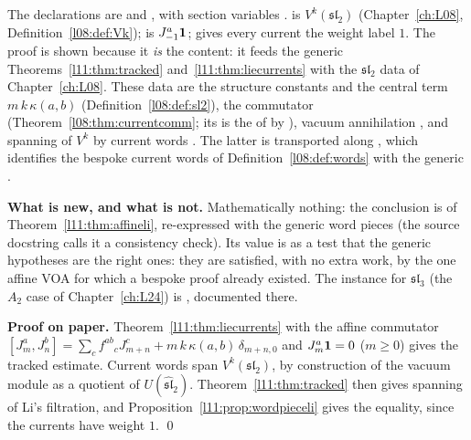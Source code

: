 \begin{dictionary}
The declarations are \allowbreak{}\allowbreak{}\allowbreak{} and
\allowbreak{}\allowbreak{}\allowbreak{}, with section variables
.  is $V^k(\mathfrak{sl}_2)$ (Chapter~\ref{ch:L08},
Definition~\ref{l08:def:Vk});  is $J^a_{-1}\mathbf{1}$;  gives every current the weight
label $1$. The proof is shown because it \emph{is} the content: it feeds the generic
Theorems~\ref{l11:thm:tracked} and~\ref{l11:thm:liecurrents} with the $\mathfrak{sl}_2$ data of Chapter~\ref{ch:L08}. These
data are the structure constants  and the central term $m\,k\,\kappa(a,b)$
(Definition~\ref{l08:def:sl2}), the commutator  (Theorem~\ref{l08:thm:currentcomm}; its
 is the  of  by ), vacuum annihilation , and
spanning of $V^k$ by current words . The latter is transported along
, which identifies the bespoke current words of Definition~\ref{l08:def:words} with
the generic .

\textbf{What is new, and what is not.} Mathematically nothing: the conclusion is
\allowbreak{}\allowbreak{} of Theorem~\ref{l11:thm:affineli}, re-expressed with
the generic word pieces (the source docstring calls it a consistency check). Its value is as a test that the generic
hypotheses are the right ones: they are satisfied, with no extra work, by the one affine VOA for which a bespoke
proof already existed. The instance for $\mathfrak{sl}_3$ (the $A_2$ case of Chapter~\ref{ch:L24}) is
\allowbreak{}\allowbreak{}\allowbreak{}, documented there.
\end{dictionary}

\textbf{Proof on paper.} Theorem~\ref{l11:thm:liecurrents} with the affine commutator
$[J^a_m,J^b_n] = \sum_cf^{ab}{}_cJ^c_{m+n}+m\,k\,\kappa(a,b)\,\delta_{m+n,0}$ and $J^a_{m}\mathbf{1} = 0$ ($m\ge0$) gives the
tracked estimate. Current words span $V^k(\mathfrak{sl}_2)$, by construction of the vacuum module as a quotient of
$U(\widehat{\mathfrak{sl}}_2)$. Theorem~\ref{l11:thm:tracked} then gives spanning of Li's filtration, and
Proposition~\ref{l11:prop:wordpieceli} gives the equality, since the currents have weight $1$. \qed

